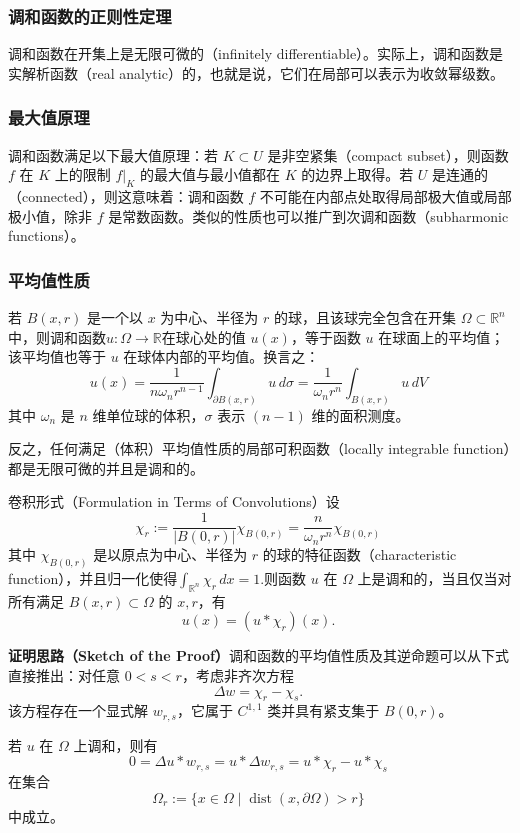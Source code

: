 \subsubsection{调和函数的正则性定理}
调和函数在开集上是无限可微的（infinitely differentiable）。实际上，调和函数是实解析函数（real analytic）的，也就是说，它们在局部可以表示为收敛幂级数。
\subsubsection{最大值原理}
调和函数满足以下最大值原理：若 \( K \subset U \) 是非空紧集（compact subset），则函数 \( f \) 在 \( K \) 上的限制 \( f|_{K} \) 的最大值与最小值都在 \( K \) 的边界上取得。若 \( U \) 是连通的（connected），则这意味着：调和函数 \( f \) 不可能在内部点处取得局部极大值或局部极小值，除非 \( f \) 是常数函数。类似的性质也可以推广到次调和函数（subharmonic functions）。
\subsubsection{平均值性质}
若 \( B(x, r) \) 是一个以 \( x \) 为中心、半径为 \( r \) 的球，且该球完全包含在开集 \(\Omega \subset \mathbb{R}^n\) 中，则调和函数\(u:\Omega \to \mathbb{R}\)在球心处的值 \(u(x)\)，等于函数 \(u\) 在球面上的平均值；该平均值也等于 \(u\) 在球体内部的平均值。换言之：
\[
u(x)
=
\frac{1}{n\omega_n r^{n-1}}
\int_{\partial B(x,r)} u\,d\sigma
=
\frac{1}{\omega_n r^n}
\int_{B(x,r)} u\,dV~
\]
其中 \(\omega_n\) 是 \(n\) 维单位球的体积，\(\sigma\) 表示 \((n-1)\) 维的面积测度。

反之，任何满足（体积）平均值性质的局部可积函数（locally integrable function）都是无限可微的并且是调和的。

卷积形式（Formulation in Terms of Convolutions）设
\[
\chi_r := 
\frac{1}{|B(0,r)|}\chi_{B(0,r)}
=
\frac{n}{\omega_n r^n}\chi_{B(0,r)}~
\]
其中 \(\chi_{B(0,r)}\) 是以原点为中心、半径为 \(r\) 的球的特征函数（characteristic function），并且归一化使得\(\int_{\mathbb{R}^n}\chi_r\,dx = 1\).则函数 \(u\) 在 \(\Omega\) 上是调和的，当且仅当对所有满足 \(B(x,r) \subset \Omega\) 的 \(x, r\)，有
\[
u(x) = (u * \chi_r)(x).~
\]

\textbf{证明思路（Sketch of the Proof）}调和函数的平均值性质及其逆命题可以从下式直接推出：对任意 \(0 < s < r\)，考虑非齐次方程
\[
\Delta w = \chi_r - \chi_s.~
\]
该方程存在一个显式解 \(w_{r,s}\)，它属于 \(C^{1,1}\) 类并具有紧支集于 \(B(0,r)\)。

若 \(u\) 在 \(\Omega\) 上调和，则有
\[
0 = \Delta u * w_{r,s} = u * \Delta w_{r,s} = u * \chi_r - u * \chi_s~
\]
在集合
\[
\Omega_r := \{x \in \Omega \mid \operatorname{dist}(x, \partial \Omega) > r \}~
\]
中成立。

